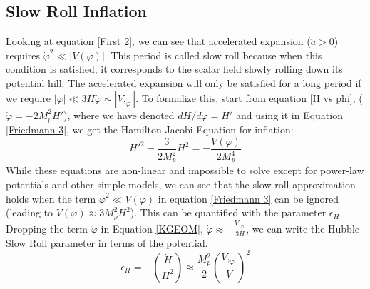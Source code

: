\documentclass[aps,prd,reprint,preprintnumbers,showpacs,floatfix,nofootinbib,superscript address]{revtex4-2}
\begin{document}
\subsection{Slow Roll Inflation} \label{Slow Roll Inflation}
Looking at equation \ref{First 2}, we can see that accelerated expansion ($\ddot{a} > 0$) requires $\dot{\varphi}^2 \ll |V(\varphi)|$. This period is called slow roll because when this condition is satisfied, it corresponds to the scalar field slowly rolling down its potential hill. The accelerated expansion will only be satisfied for a long period if we require $|\ddot{\varphi}| \ll 3H\dot{\varphi} \sim |V,_{\varphi}|$. To formalize this, start from equation \ref{H vs phi}, ($\dot{\varphi}  = -  2 M_p^2 H'$), where we have denoted $dH/d\varphi = H'$ and using it in Equation \ref{Friedmann 3}, we get the Hamilton-Jacobi Equation \cite{copeland1993reconstructing, salopek1990nonlinear} for inflation:
\begin{equation}    \label{Hamilton-Jacobi}
    H'^2 - \frac{3}{2M_p^2}H^2 = - \frac{V(\varphi)}{2M_p^4} 
\end{equation}
While these equations are non-linear and impossible to solve except for power-law potentials and other simple models, we can see that the slow-roll approximation holds when the term $\dot{\varphi}^2 \ll V(\varphi)$ in equation \ref{Friedmann 3} can be ignored (leading to $V(\varphi) \approx 3M_p^2H^2$). This can be quantified with the parameter $\epsilon_H$. Dropping the term $\ddot{\varphi}$ in Equation \ref{KGEOM}, $\dot{\varphi} \approx -\frac{V,_\varphi}{3H}$, we can write the Hubble Slow Roll parameter in terms of the potential.
\begin{equation}
    \epsilon_H = - \left(\frac{\dot{H}}{H^2} \right) \approx \frac{M_p^2}{2} \left(\frac{V,_\varphi}{V}\right)^2
\end{equation}

\end{document}
